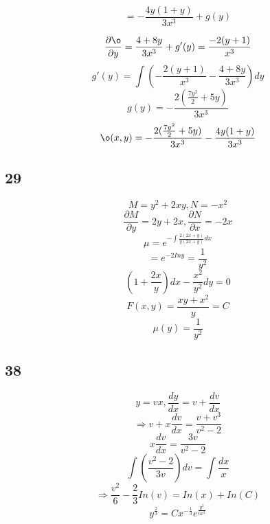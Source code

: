 \documentclass[12pt, a4paper]{IEEEtran}
\begin{document}
$$=-\frac{4y(1+y)}{3x^3}+g(y)$$

$$\frac{\partial \o}{\partial y}=\frac{4+8y}{3x^3}+g'(y)=\frac{-2(y+1)}{x^3}$$
$$g'(y)=\int (-\frac{2(y+1)}{x^3}-\frac{4+8y}{3x^3})dy$$
$$g(y)=-\frac{2(\frac{7y^2}{2}+5y)}{3x^3}$$
$$\o(x,y)=-\frac{2(\frac{7y^2}{2}+5y)}{3x^3}-\frac{4y(1+y)}{3x^3}$$

\subsection*{29}
$$M=y^2+2xy, N=-x^2$$
$$\frac{\partial M}{\partial y}=2y+2x, \frac{\partial N}{\partial x}=-2x$$
$$\mu=e^{-\int \frac{2(2x+y)}{y(2x+y)}dx}$$
$$=e^{-2In y}=\frac{1}{y^2}$$
$$(1+\frac{2x}{y})dx-\frac{x^2}{y^2}dy=0$$
$$F(x,y)=\frac{xy+x^2}{y}=C$$
$$\mu (y)=\frac{1}{y^2}$$

\subsection*{38}
$$y=vx, \frac{dy}{dx}=v+\frac{dv}{dx}$$
$$\Rightarrow v+x\frac{dv}{dx}=\frac{v+v^3}{v^2-2}$$
$$x\frac{dv}{dx}=\frac{3v}{v^2-2}$$
$$\int (\frac{v^2-2}{3v})dv=\int \frac{dx}{x}$$
$$\Rightarrow \frac{v^2}{6}-\frac{2}{3}In(v)=In(x)+In(C)$$
$$y^{\frac{2}{3}}=Cx^{-\frac{1}{3}}e^{\frac{y^2}{6x^2}}$$
\end{document}
